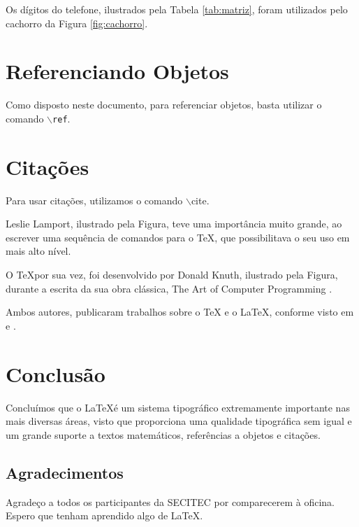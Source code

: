 \documentclass[twocolumn]{article}
\begin{document}
Os dígitos do telefone, ilustrados pela Tabela \ref{tab:matriz}, foram utilizados pelo cachorro da Figura
\ref{fig:cachorro}.

\section{Referenciando Objetos}
Como disposto neste documento, para referenciar objetos, basta utilizar o comando {\tt $\backslash$ref}.
\section{Citações}
Para usar citações, utilizamos o comando {$\backslash$cite}.

Leslie Lamport, ilustrado pela Figura, teve uma importância muito grande, ao escrever uma sequência de comandos para o \TeX, que possibilitava o seu uso em mais alto nível.

O \TeX por sua vez, foi desenvolvido por Donald Knuth, ilustrado pela Figura,  durante a escrita da sua obra clássica, The Art of Computer Programming \cite{Knuth81}.

Ambos autores, publicaram trabalhos sobre o \TeX{} e o \LaTeX, conforme visto em \cite{knuth1979tex} e \cite{lamport1986document}.

\section{Conclusão}
Concluímos que o \LaTeX é um sistema tipográfico extremamente importante nas mais diversas áreas, visto que proporciona uma qualidade tipográfica sem igual e um grande suporte a textos matemáticos, referências a objetos e citações.
\subsection{Agradecimentos}
Agradeço a todos os participantes da SECITEC por comparecerem à oficina. Espero que tenham aprendido algo de \LaTeX.



\end{document}
